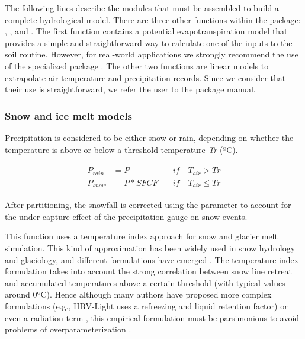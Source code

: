 The following lines describe the modules that must be assembled to build a complete  hydrological model. 
There are three other functions within the package: , , and
. The first function contains a potential evapotranspiration model that provides a simple and 
straightforward way to calculate one of the inputs to the soil routine. However, for real-world applications we strongly
recommend the use of the specialized  package \citep{pet:2020}. The other two functions are linear
models to extrapolate air temperature and precipitation records. Since we consider that their use is straightforward, 
we refer the user to the package manual.


\subsubsection{Snow and ice melt models – }

Precipitation is considered to be either snow or rain, depending on whether the temperature is above or below a threshold
temperature \textit{Tr} (ºC). 

\begin{align}
\begin{aligned}
P_{rain} & = P \quad         & \textit{if} \quad T_{air} > Tr \\
P_{snow} & = P * SFCF \quad  & \textit{if} \quad T_{air} \leq Tr
\end{aligned}
\end{align}

\noindent
After partitioning, the snowfall is corrected using the  parameter to account for the under-capture effect of the 
precipitation gauge on snow events.

This function uses a temperature index approach for snow and glacier melt simulation. This kind of approximation has been widely
used in snow hydrology and glaciology, and different formulations have emerged 
\citep{hock:2003, seibert:2012, braun:1992}. The temperature index formulation takes into account the strong correlation between
snow line retreat and accumulated temperatures above a certain threshold (with typical values around $0$ºC). Hence although many
authors have proposed more complex formulations (e.g., HBV-Light uses a refreezing and liquid retention factor) or even a radiation
term \citep{pellicciotti:2005}, this empirical formulation must be parsimonious to avoid problems of overparameterization 
\citep{kirchner:2006}.

